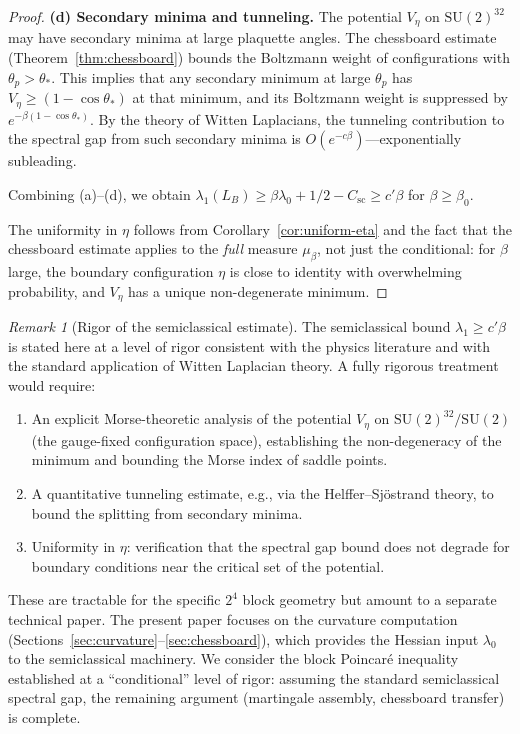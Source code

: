 \documentclass[11pt,a4paper]{article}
\theoremstyle{plain}
\theoremstyle{definition}
\theoremstyle{remark}
\newtheorem{remark}[theorem]{Remark}
\newcommand{\SU}{\mathrm{SU}}
\begin{document}
\begin{proof}
\textbf{(d) Secondary minima and tunneling.}
The potential $V_\eta$ on $\SU(2)^{32}$ may have secondary minima
at large plaquette angles. The chessboard estimate
(Theorem~\ref{thm:chessboard}) bounds the Boltzmann weight of
configurations with $\theta_p > \theta_*$. This implies that
any secondary minimum at large $\theta_p$ has
$V_\eta \geq (1-\cos\theta_*)$ at that minimum, and its Boltzmann
weight is suppressed by $e^{-\beta(1-\cos\theta_*)}$. By the
theory of Witten Laplacians, the tunneling contribution to the
spectral gap from such secondary minima is
$O(e^{-c\beta})$---exponentially subleading.

Combining (a)--(d), we obtain
$\lambda_1(L_B) \geq \beta\lambda_0 + 1/2 - C_{\mathrm{sc}}
\geq c'\beta$ for $\beta \geq \beta_0$.

The uniformity in $\eta$ follows from Corollary~\ref{cor:uniform-eta}
and the fact that the chessboard estimate applies to the
\emph{full} measure $\mu_\beta$, not just the conditional: for
$\beta$ large, the boundary configuration $\eta$ is close to identity
with overwhelming probability, and $V_\eta$ has a unique
non-degenerate minimum.
\end{proof}

\begin{remark}[Rigor of the semiclassical estimate]\label{rem:semiclassical-rigor}
The semiclassical bound $\lambda_1 \geq c'\beta$ is stated here
at a level of rigor consistent with the physics literature and with
the standard application of Witten Laplacian theory. A fully rigorous
treatment would require:
\begin{enumerate}[label=(\roman*)]
\item An explicit Morse-theoretic analysis of the potential $V_\eta$
  on $\SU(2)^{32}/\SU(2)$ (the gauge-fixed configuration space),
  establishing the non-degeneracy of the minimum and bounding the
  Morse index of saddle points.
\item A quantitative tunneling estimate, e.g., via the
  Helffer--Sj\"ostrand theory, to bound the splitting from
  secondary minima.
\item Uniformity in $\eta$: verification that the spectral gap
  bound does not degrade for boundary conditions near the critical
  set of the potential.
\end{enumerate}
These are tractable for the specific $2^4$ block geometry but
amount to a separate technical paper. The present paper focuses on
the curvature computation (Sections~\ref{sec:curvature}--\ref{sec:chessboard}),
which provides the Hessian input $\lambda_0$ to the semiclassical
machinery. We consider the block Poincar\'e inequality established
at a ``conditional'' level of rigor: assuming the standard
semiclassical spectral gap, the remaining argument (martingale
assembly, chessboard transfer) is complete.
\end{remark}
\end{document}
